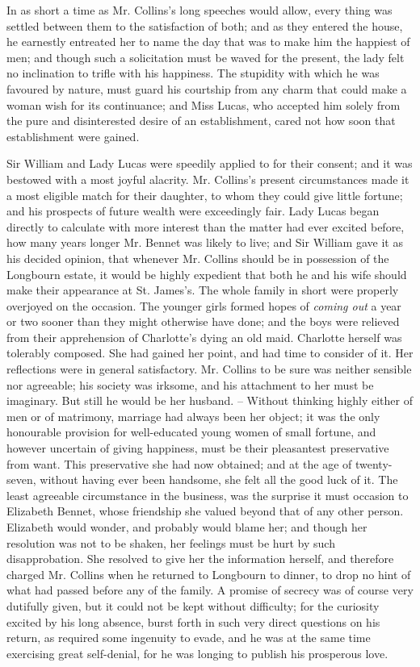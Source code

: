 In as short a time as Mr. Collins’s long speeches would
allow, every thing was settled between them to the satisfaction
of both; and as they entered the house, he earnestly
entreated her to name the day that was to make him the
happiest of men; and though such a solicitation must be
waved for the present, the lady felt no inclination to
trifle with his happiness. The stupidity with which he
was favoured by nature, must guard his courtship from
any charm that could make a woman wish for its continuance;
and Miss Lucas, who accepted him solely from the
pure and disinterested desire of an establishment, cared
not how soon that establishment were gained.

Sir William and Lady Lucas were speedily applied to
for their consent; and it was bestowed with a most
joyful alacrity. Mr. Collins’s present circumstances made
it a most eligible match for their daughter, to whom they
could give little fortune; and his prospects of future
wealth were exceedingly fair. Lady Lucas began directly
to calculate with more interest than the matter had ever
excited before, how many years longer Mr. Bennet was
likely to live; and Sir William gave it as his decided
opinion, that whenever Mr. Collins should be in possession
of the Longbourn estate, it would be highly expedient
that both he and his wife should make their appearance
at St. James’s. The whole family in short were properly
overjoyed on the occasion. The younger girls formed
hopes of \textit{coming out} a year or two sooner than they might
otherwise have done; and the boys were relieved from
their apprehension of Charlotte’s dying an old maid.
Charlotte herself was tolerably composed. She had gained
her point, and had time to consider of it. Her reflections
were in general satisfactory. Mr. Collins to be sure was
neither sensible nor agreeable; his society was irksome,
and his attachment to her must be imaginary. But still
he would be her husband. -- Without thinking highly either
of men or of matrimony, marriage had always been her
object; it was the only honourable provision for well-educated
young women of small fortune, and however
uncertain of giving happiness, must be their pleasantest
preservative from want. This preservative she had now
obtained; and at the age of twenty-seven, without having
ever been handsome, she felt all the good luck of it. The
least agreeable circumstance in the business, was the surprise
it must occasion to Elizabeth Bennet, whose friendship
she valued beyond that of any other person. Elizabeth
would wonder, and probably would blame her; and though
her resolution was not to be shaken, her feelings must be
hurt by such disapprobation. She resolved to give her
the information herself, and therefore charged Mr. Collins
when he returned to Longbourn to dinner, to drop no
hint of what had passed before any of the family. A promise
of secrecy was of course very dutifully given, but it
could not be kept without difficulty; for the curiosity
excited by his long absence, burst forth in such very
direct questions on his return, as required some ingenuity
to evade, and he was at the same time exercising great
self-denial, for he was longing to publish his prosperous love.

